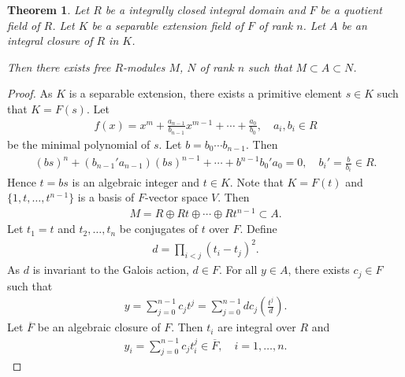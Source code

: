 \documentclass[12pt]{article}
\theoremstyle{plain}
\newtheorem{theorem}{Theorem}[section]
\theoremstyle{remark}
\theoremstyle{definition}
\begin{document}
\begin{theorem}\label{Theorem 1.2.6.}
    Let $R$ be a integrally closed integral domain and $F$ be a quotient field of $R$. Let $K$ be a separable extension field of $F$ of rank $n$. Let $A$ be an integral closure of $R$ in $K$.
    \begin{figure}[H]
        \centering
    \end{figure}
    \noindent Then there exists free $R$-modules $M$, $N$ of rank $n$ such that $M\subset A\subset N$.
\end{theorem}
\begin{proof}
    As $K$ is a separable extension, there exists a primitive element $s\in K$ such that $K=F(s)$. Let
    \begin{align*}
        f(x) = x^m + \frac{a_{n-1}}{b_{n-1}}x^{m-1} + \cdots + \frac{a_0}{b_0},\quad a_i,b_i\in R
    \end{align*}
    be the minimal polynomial of $s$. Let $b=b_0\cdots b_{n-1}$. Then
    \begin{align*}
        (bs)^n + (b_{n-1}'a_{n-1})(bs)^{n-1} + \cdots+b^{n-1}b_0'a_0 = 0,\quad b_i' = \frac{b}{b_i}\in R.
    \end{align*}
    Hence $t=bs$ is an algebraic integer and $t\in K$. Note that $K=F(t)$ and $\{1,t,\dots,t^{n-1}\}$ is a basis of $F$-vector space $V$. Then
    \begin{align*}
        M = R\oplus Rt\oplus \cdots\oplus Rt^{n-1} \subset A.
    \end{align*}
    Let $t_1 = t$ and $t_2,\dots,t_n$ be conjugates of $t$ over $F$. Define
    \begin{align*}
        d = \prod_{i<j} (t_i-t_j)^2.
    \end{align*}
    As $d$ is invariant to the Galois action, $d\in F$. For all $y\in A$, there exists $c_j\in F$ such that
    \begin{align*}
        y = \sum_{j=0}^{n-1}c_j t^j =\sum_{j=0}^{n-1} dc_j \left( \frac{t^j}{d} \right).
    \end{align*}
    Let $\overline{F}$ be an algebraic closure of $F$. Then $t_i$ are integral over $R$ and
    \begin{align*}
        y_i = \sum_{j=0}^{n-1}c_j t_i^j \in \overline{F},\quad i=1,\dots,n.
    \end{align*}

\end{proof}
\end{document}
